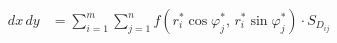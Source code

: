 \documentclass[preview]{standalone}
\begin{document}
\begin{align*}
\,dx\,dy &= \sum_{i=1}^m \sum_{j=1}^n f\left(r_i^* \cos\varphi_j^*,\, r_i^* \sin\varphi_j^*\right)\cdot S_{D_{ij}} \\
\end{align*}
\end{document}
